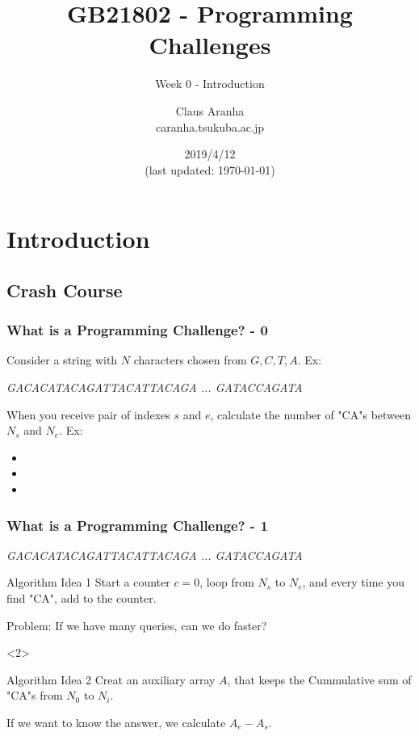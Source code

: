 \documentclass{beamer}
\title[GB21802]{GB21802 - Programming Challenges}
\subtitle[]{Week 0 - Introduction}
\author[Claus Aranha]{Claus Aranha\\{\footnotesize caranha\@@cs.tsukuba.ac.jp}}
\institute{Department of Computer Science}
\date{2019/4/12\\{\smaller(last updated: \today)}}
\begin{document}
\section{Introduction}
\begin{frame}
\maketitle
\end{frame}

\subsection{Crash Course}
\begin{frame}
  \frametitle{What is a Programming Challenge? - 0}

  Consider a string with $N$ characters chosen from $G,C,T,A$. Ex:

  \begin{center}
    \emph{\alert<2>{GACA\alert<4>{CATACAG}AT}TA\alert<3>{CATTAC}AGA ... GATACCAGATA}
  \end{center}

  When you receive pair of indexes $s$ and $e$, calculate the number of "CA"s between $N_s$ and $N_e$. Ex:

  \begin{itemize}
    \item {}
    \item {}
    \item {}
  \end{itemize}
\end{frame}

\begin{frame}[t]
  \frametitle{What is a Programming Challenge? - 1}

  \begin{center}
    \emph{GACACATACAGATTACATTACAGA ... GATACCAGATA}
  \end{center}

  \begin{block}{Algorithm Idea 1}
    Start a counter $c = 0$, loop from $N_s$ to $N_e$,
    and every time you find "CA", add to the counter.
    \bigskip

    \alert{Problem: If we have many queries, can we do faster?}
  \end{block}

  \begin{onlyenv}<2>

  \begin{block}{Algorithm Idea 2}
    Creat an auxiliary array $A$, that keeps the \alert{Cummulative sum} of "CA"s from $N_0$ to $N_i$.

    \bigskip

    If we want to know the answer, we calculate $A_e - A_s$.
  \end{block}
  \end{onlyenv}
\end{frame}
\end{document}
